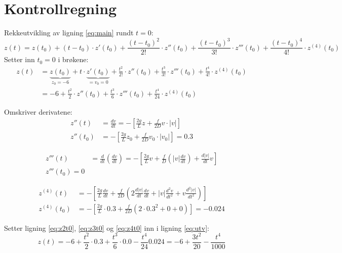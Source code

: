 \section{Kontrollregning} %
\label{sec:kontrollregning}
Rekkeutvikling av ligning \eqref{eq:main} rundt $t=0$:
\begin{equation}
  z(t)  = z(t_0) + (t-t_0) \cdot z'(t_0)
        + \frac{(t-t_0)^2}{2!} \cdot z''(t_0)
        + \frac{(t-t_0)^3}{3!} \cdot z'''(t_0)
        + \frac{(t-t_0)^4}{4!} \cdot z^{(4)}(t_0)
\end{equation}
Setter inn $t_0 = 0$ i brøkene:
\begin{align}
  z(t) &= \underbrace{z(t_0)}_{z_0=-6} 
        + t \cdot \underbrace{z'(t_0)}_{=v_0=0}
        + \frac{t^2}{2!} \cdot z''(t_0)
        + \frac{t^3}{3!} \cdot z'''(t_0)
        + \frac{t^4}{4!} \cdot z^{(4)}(t_0) \nonumber\\
       &= -6 + \frac{t^2}{2} \cdot z''(t_0)
        + \frac{t^3}{6} \cdot z'''(t_0)
        + \frac{t^4}{24} \cdot z^{(4)}(t_0) \label{eq:utv}
\end{align}

\noindent Omskriver derivatene:
\begin{align}
  z''(t)   & = \frac{dv}{dt}=-\left[\frac{2g}{L}z+\frac{f}{2D}v\cdot |v|\right]\\
  z''(t_0) & = -\left[\frac{2g}{L}z_0 + \frac{f}{2D}v_0 \cdot |v_0|\right]
             = 0.3 \label{eq:z2t0}
\end{align}

\begin{align}
  z'''(t) & =  \frac{d}{dt} \left( \frac{dv}{dt} \right)
          = -\left[\frac{2g}{L}v+\frac{f}{D} 
            \left( |v| \frac{dv}{dt} \right) + \frac{d|v|}{dt} v \right] \\
  z'''(t_0) = 0 \label{eq:z3t0}
\end{align}

\begin{align}
  z^{(4)}(t) &= 
  - \left[ 
    \frac{2g}{L}\frac{dv}{dt} + 
    \frac{f}{2D} 
      \left(
        2 \frac{d|v|}{dt} \frac{dv}{dt} + 
        |v| \frac{d^2v}{dt^2} + 
        v \frac{d^2|v|}{dt^2} 
      \right) 
  \right] \\
  z^{(4)}(t_0) &= 
    - \left[ 
    \frac{2g}{L} \cdot 0.3+ 
    \frac{f}{2D} 
      \left(
        2 \cdot 0.3^2 + 
        0 + 
        0 
      \right) 
  \right] = -0.024 \label{eq:z4t0}
\end{align}

Setter ligning \eqref{eq:z2t0}, \eqref{eq:z3t0} og \eqref{eq:z4t0} inn i ligning \eqref{eq:utv}:
\begin{equation}
  z(t)  = -6 + \frac{t^2}{2} \cdot 0.3
        + \frac{t^3}{6} \cdot 0.0
        - \frac{t^4}{24} 0.024 \nonumber 
        = -6 + \frac{3t^2}{20}
        - \frac{t^4}{1000}
\end{equation}

